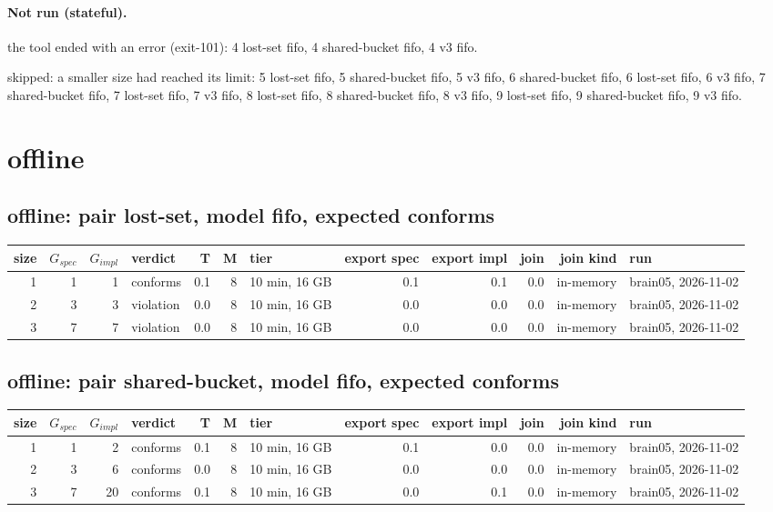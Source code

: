 \documentclass[10pt]{article}
\begin{document}
\paragraph{Not run (stateful).}
the tool ended with an error (exit-101): 4 lost-set fifo, 4 shared-bucket fifo, 4 v3 fifo.\par
skipped: a smaller size had reached its limit: 5 lost-set fifo, 5 shared-bucket fifo, 5 v3 fifo, 6 shared-bucket fifo, 6 lost-set fifo, 6 v3 fifo, 7 shared-bucket fifo, 7 lost-set fifo, 7 v3 fifo, 8 lost-set fifo, 8 shared-bucket fifo, 8 v3 fifo, 9 lost-set fifo, 9 shared-bucket fifo, 9 v3 fifo.\par
\section*{offline}
\subsection*{offline: pair \textsf{lost-set}, model fifo, expected conforms}
\begin{longtable}{@{}rrrlrrlrrrrl@{}}
\toprule
size & $G_{\mathit{spec}}$ & $G_{\mathit{impl}}$ & verdict & T & M & tier & export spec & export impl & join & join kind & run \\
\midrule
\endhead
\color{red} 1 & 1 & 1 & conforms & 0.1 & 8 & 10 min, 16 GB & 0.1 & 0.1 & 0.0 & in-memory & brain05, 2026-11-02 \\
\color{red} 2 & 3 & 3 & violation & 0.0 & 8 & 10 min, 16 GB & 0.0 & 0.0 & 0.0 & in-memory & brain05, 2026-11-02 \\
\color{red} 3 & 7 & 7 & violation & 0.0 & 8 & 10 min, 16 GB & 0.0 & 0.0 & 0.0 & in-memory & brain05, 2026-11-02 \\
\bottomrule
\end{longtable}
\subsection*{offline: pair \textsf{shared-bucket}, model fifo, expected conforms}
\begin{longtable}{@{}rrrlrrlrrrrl@{}}
\toprule
size & $G_{\mathit{spec}}$ & $G_{\mathit{impl}}$ & verdict & T & M & tier & export spec & export impl & join & join kind & run \\
\midrule
\endhead
\color{red} 1 & 1 & 2 & conforms & 0.1 & 8 & 10 min, 16 GB & 0.1 & 0.0 & 0.0 & in-memory & brain05, 2026-11-02 \\
\color{red} 2 & 3 & 6 & conforms & 0.0 & 8 & 10 min, 16 GB & 0.0 & 0.0 & 0.0 & in-memory & brain05, 2026-11-02 \\
\color{red} 3 & 7 & 20 & conforms & 0.1 & 8 & 10 min, 16 GB & 0.0 & 0.1 & 0.0 & in-memory & brain05, 2026-11-02 \\
\bottomrule
\end{longtable}
\end{document}
